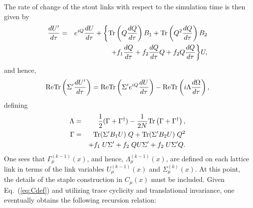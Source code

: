 The rate of change of the stout links with respect to the simulation
time is then given by
\begin{eqnarray}
  \frac{dU^\prime}{d\tau} &=& e^{i Q} \frac{dU}{d\tau} 
  + \biggl\{  \mbox{Tr}\left(Q\frac{dQ}{d\tau}\right) B_1
   +\mbox{Tr}\left(Q^2\frac{dQ}{d\tau}\right) B_2 \nonumber\\
   &&\qquad + f_1\frac{dQ}{d\tau}+f_2\frac{dQ}{d\tau}Q+f_2Q\frac{dQ}{d\tau}
 \biggr\} U,
\end{eqnarray}
and hence, 
\begin{equation}
\mbox{ReTr}\left(\Sigma^\prime
  \frac{dU^\prime}{d\tau}\right)
 =\mbox{ReTr}\left(\Sigma^\prime e^{i Q} \frac{dU}{d\tau}\right)
                    - \mbox{ReTr}\left(i\Lambda \frac{d\Omega}{d\tau}\right),
   \label{eqn:diff-stouttrace}
\end{equation}
defining 
\begin{eqnarray}
   \Lambda &=& 
   \frac{1}{2} (\Gamma + \Gamma^\dagger) - \frac{1}{2N} 
      \mbox{Tr}\left(\Gamma + \Gamma^\dagger\right), \label{eq:Lambda}\\
  \Gamma &=& 
  \mbox{Tr}(\Sigma^\prime B_1 U) \; Q         
+ \mbox{Tr}(\Sigma^\prime B_2 U) \; Q^2 \nonumber\\
&&+ f_1  \; U \Sigma^\prime   
+ f_2  \; Q U \Sigma^\prime 
+ f_2  \; U \Sigma^\prime Q.
\label{eqn:gamma-def}
\end{eqnarray}
One sees that $\Gamma^{(k-1)}_\mu(x)$,
and hence, $\Lambda_\mu^{(k\!-\!1)}(x)$, are defined on each
lattice link in terms of the link variables $U^{(k-1)}_\mu(x)$ and 
$\Sigma^{(k)}_\mu(x)$. At this point, the details of the staple
construction in $C_\mu(x)$ must be included.  Given Eq.~(\ref{eq:Cdef})
and utilizing trace cyclicity and translational invariance,
one eventually obtains the following recursion relation:
